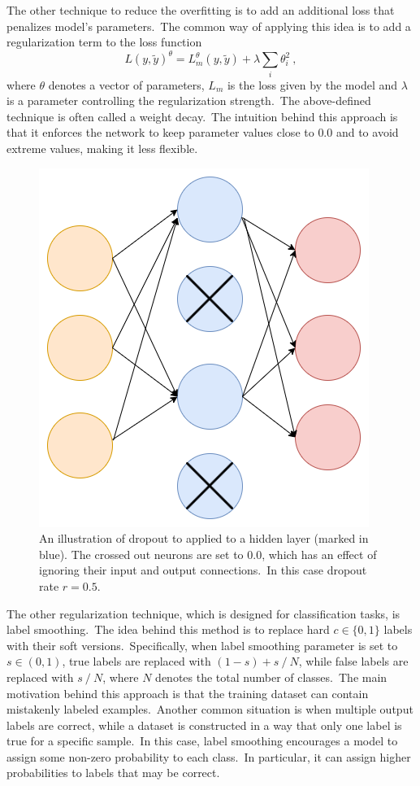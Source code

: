 \documentclass[longabstract, english, mgr]{iithesis}
\theoremstyle{default_theorem_style}\newtheorem{theorem}{Theorem}
\theoremstyle{default_theorem_style}\newtheorem{definition}{Definition}
\begin{document}
\noindent The other technique to reduce the overfitting is to add an additional loss that penalizes model's
parameters.\ The common way of applying this idea is to add a regularization term to the loss function
$$
L(y, \tilde{y})^{\theta} = L_m^{\theta}(y, \tilde{y}) + \lambda \sum_i \theta_i^2\ ,
$$
where $\theta$ denotes a vector of parameters, $L_m$ is the loss given by the model and $\lambda$ is a parameter
controlling the regularization strength.\ The above-defined technique is often called a weight decay.\ The intuition
behind this approach is that it enforces the network to keep parameter values close to $0.0$ and to avoid extreme
values, making it less flexible.\newline

\begin{figure}[t]
\centering
\includegraphics[scale=0.42]{dropout}
\caption{An illustration of dropout to applied to a hidden layer (marked in blue). The crossed out neurons are set
to $0.0$, which has an effect of ignoring their input and output connections.\ In this case dropout rate $r = 0.5$.}
\label{fig:dropout}
\end{figure}

\noindent The other regularization technique, which is designed for classification tasks, is label
smoothing.\ The idea behind this method is to replace hard $c \in \{0, 1\}$ labels with their soft
versions.\ Specifically, when label smoothing parameter is set to $s \in (0, 1)$, true labels are replaced with
$(1 - s) + s\ /\ N$, while false labels are replaced with $s\ /\ N$, where $N$ denotes the total number of
classes.\ The main motivation behind this approach is that the training dataset can contain mistakenly labeled
examples.\ Another common situation is when multiple output labels are correct, while a dataset is constructed in a way
that only one label is true for a specific sample.\ In this case, label smoothing encourages a model to assign some
non-zero probability to each class.\ In particular, it can assign higher probabilities to labels that may be correct.
\end{document}
